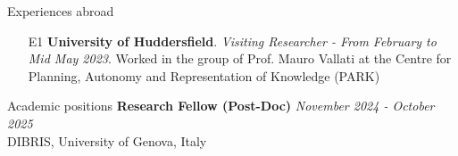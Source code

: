 \documentclass{resume} %
\begin{document}

\begin{rSection}{Experiences abroad}
\begin{enumerate}[leftmargin=5mm]
\item[E1] \textbf{University of Huddersfield}. \textit{Visiting Researcher - From February to Mid May 2023}. Worked in the group of Prof. Mauro Vallati at the Centre for Planning, Autonomy and Representation of Knowledge (PARK)  
\end{enumerate}
\end{rSection}





\begin{rSection}{Academic positions}
{\bf  Research Fellow (Post-Doc)} \hfill {\em November 2024 - \textit{October 2025}} \\ 
DIBRIS, University of Genova, Italy
\end{rSection}
\end{document}

